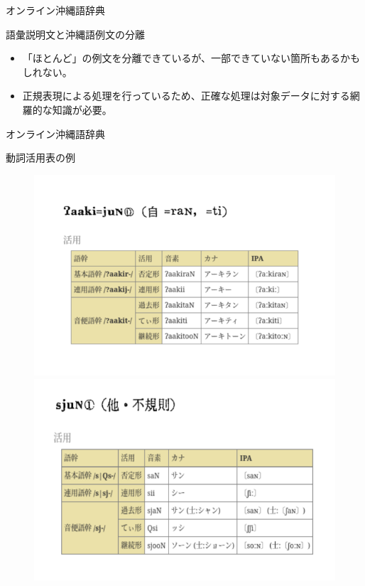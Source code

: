 \documentclass[14pt]{beamer}
\begin{document}
\begin{frame}{オンライン沖縄語辞典}
  \begin{block}{語彙説明文と沖縄語例文の分離}
    \begin{itemize}
    \item 「ほとんど」の例文を分離できているが、一部できていない箇所もあるかもしれない。
    \item 正規表現による処理を行っているため、正確な処理は対象データに対する網羅的な知識が必要。
    \end{itemize}
  \end{block}
\end{frame}

\begin{frame}{オンライン沖縄語辞典}
  \begin{block}{動詞活用表の例}
    \begin{figure}[ht]
      \centering
      \begin{minipage}{0.4\paperwidth}
        \includegraphics[height=0.36\paperheight]{verb-conugation-comparison.png}
      \end{minipage}%
      \begin{minipage}{0.4\textwidth}
        \includegraphics[height=0.34\paperheight]{verb-conjugation-comparison-2.png}
      \end{minipage}
    \end{figure}
  \end{block}
\end{frame}
\end{document}
